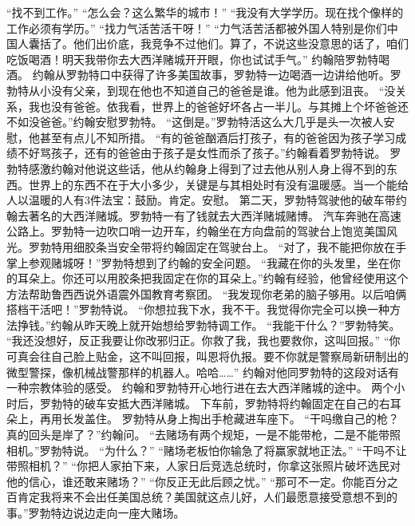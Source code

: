 \documentclass[a4paper,12pt,UTF8,twoside]{ctexbook}
\begin{document}
        “找不到工作。”  
        “怎么会？这么繁华的城市！”        
        “我没有大学学历。现在找个像样的工作必须有学历。”  
        “找力气活苦活干呀！”  
        “力气活苦活都被外国人特别是你们中国人囊括了。他们出价底，我竞争不过他们。算了，不说这些没意思的话了，咱们吃饭喝酒！明天我带你去大西洋赌城开开眼，你也试试手气。”  
        约翰陪罗勃特喝酒。  
        约翰从罗勃特口中获得了许多美国故事，罗勃特一边喝酒一边讲给他听。罗勃特从小没有父亲，到现在他也不知道自己的爸爸是谁。他为此感到沮丧。  
        “没关系，我也没有爸爸。依我看，世界上的爸爸好坏各占一半儿。与其摊上个坏爸爸还不如没爸爸。”约翰安慰罗勃特。  
        “这倒是。”罗勃特活这么大几乎是头一次被人安慰，他甚至有点儿不知所措。  
        “有的爸爸酗酒后打孩子，有的爸爸因为孩子学习成绩不好骂孩子，还有的爸爸由于孩子是女性而杀了孩子。”约翰看着罗勃特说。  
        罗勃特感激约翰对他说这些话，他从约翰身上得到了过去他从别人身上得不到的东西。世界上的东西不在于大小多少，关键是与其相处时有没有温暖感。当一个能给人以温暖的人有3件法宝：鼓励。肯定。安慰。  
        第二天，罗勃特驾驶他的破车带约翰去著名的大西洋赌城。罗勃特一有了钱就去大西洋赌城赌博。  
        汽车奔驰在高速公路上。罗勃特一边吹口哨一边开车，约翰坐在方向盘前的驾驶台上饱览美国风光。罗勃特用细胶条当安全带将约翰固定在驾驶台上。  
        “对了，我不能把你放在手掌上参观赌城呀！”罗勃特想到了约翰的安全问题。  
        “我藏在你的头发里，坐在你的耳朵上。你还可以用胶条把我固定在你的耳朵上。”约翰有经验，他曾经使用这个方法帮助鲁西西说外语震外国教育考察团。  
        “我发现你老弟的脑子够用。以后咱俩搭档干活吧！”罗勃特说。  
        “你想拉我下水，我不干。我觉得你完全可以换一种方法挣钱。”约翰从昨天晚上就开始想给罗勃特调工作。  
        “我能干什么？”罗勃特笑。  
        “我还没想好，反正我要让你改邪归正。你救了我，我也要救你，这叫回报。”  
        “你可真会往自己脸上贴金，这不叫回报，叫恩将仇报。要不你就是警察局新研制出的微型警探，像机械战警那样的机器人。哈哈……”        
        约翰对他同罗勃特的这段对话有一种宗教体验的感受。  
        约翰和罗勃特开心地行进在去大西洋赌城的途中。  
        两个小时后，罗勃特的破车安抵大西洋赌城。  
        下车前，罗勃特将约翰固定在自己的右耳朵上，再用长发盖住。  
        罗勃特从身上掏出手枪藏进车座下。  
        “干吗缴自己的枪？真的回头是岸了？”约翰问。  
        “去赌场有两个规矩，一是不能带枪，二是不能带照相机。”罗勃特说。  
        “为什么？”  
        “赌场老板怕你输急了将赢家就地正法。”  
        “干吗不让带照相机？”  
        “你把人家拍下来，人家日后竞选总统时，你拿这张照片破坏选民对他的信心，谁还敢来赌场？”  
        “你反正无此后顾之忧。”  
        “那可不一定。你能百分之百肯定我将来不会出任美国总统？美国就这点儿好，人们最愿意接受意想不到的事。”罗勃特边说边走向一座大赌场。  
\end{document}

